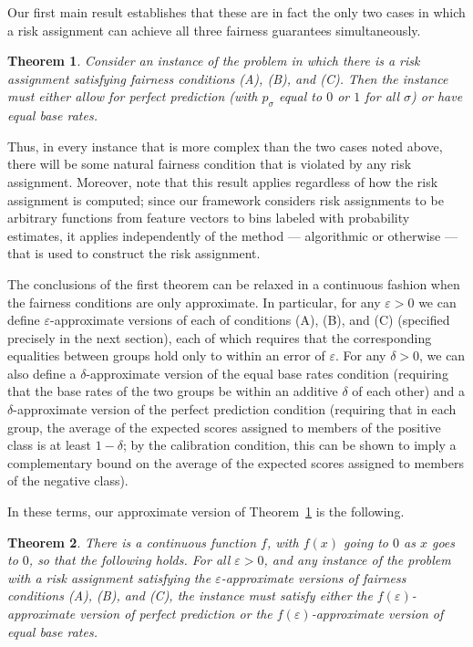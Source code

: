 \documentclass[11pt]{article}
\def\eps{\varepsilon}
\newtheorem{theorem}{Theorem}[section]
\begin{document}
Our first main result establishes that these are in fact the only two cases
in which a risk assignment can achieve all three fairness 
guarantees simultaneously.  

\begin{theorem}
Consider an instance of the problem in which there is a 
risk assignment 
satisfying fairness conditions (A), (B), and (C).
Then the instance must either allow for perfect prediction
(with $p_\sigma$ equal to $0$ or $1$ for all $\sigma$) or 
have equal base rates.
\label{thm:exact}
\end{theorem}

Thus, in every instance that is more complex than the two cases
noted above, there will be some natural fairness condition that is
violated by any risk assignment.
Moreover, note that this result applies regardless of how the
risk assignment is computed; since our framework considers risk assignments
to be arbitrary functions from feature vectors to bins
labeled with probability estimates, 
it applies independently of the method --- algorithmic or otherwise ---
that is used to construct the risk assignment.

The conclusions of the first theorem 
can be relaxed in a continuous fashion
when the fairness conditions are only approximate.
In particular, for any $\eps > 0$ 
we can define $\eps$-approximate versions of
each of conditions (A), (B), and (C) (specified precisely in the next
section), each of which requires that the corresponding equalities
between groups hold only to within an error of $\eps$.
For any $\delta > 0$, we can also define a 
$\delta$-approximate version of the equal base rates condition
(requiring that the base rates of the two groups 
be within an additive $\delta$ of each other)
and a $\delta$-approximate 
version of the perfect prediction condition (requiring that 
in each group, the average of the expected scores assigned
to members of the positive class is at least $1 - \delta$;
by the calibration condition, this can be shown to imply a 
complementary bound on the average of the expected scores
assigned to members of the negative class).

In these terms, our approximate version of Theorem~\ref{thm:exact}
is the following.

\begin{theorem}
There is a continuous function $f$, with $f(x)$ going to $0$ as 
$x$ goes to $0$, so that the following holds.
For all $\eps > 0$, and 
any instance of the problem with a risk assignment
satisfying the $\eps$-approximate versions
of fairness conditions (A), (B), and (C),
the instance must satisfy either the $f(\eps)$-approximate version of
perfect prediction or the $f(\eps)$-approximate version of
equal base rates.
\label{thm:approx}
\end{theorem}
\end{document}
